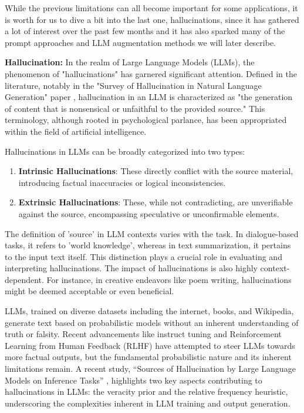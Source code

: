 \documentclass[conference]{IEEEtran}
\begin{document}
While the previous limitations can all become important for some applications, it is worth for us to dive a bit into the last one, hallucinations, since it has gathered a lot of interest over the past few months and it has also sparked many of the prompt approaches and LLM augmentation methods we will later describe.

\textbf{Hallucination:}
In the realm of Large Language Models (LLMs), the phenomenon of "hallucinations" has garnered significant attention. Defined in the literature, notably in the "Survey of Hallucination in Natural Language Generation" paper \cite{ziweiHallucinations}, hallucination in an LLM is characterized as "the generation of content that is nonsensical or unfaithful to the provided source." This terminology, although rooted in psychological parlance, has been appropriated within the field of artificial intelligence.

Hallucinations in LLMs can be broadly categorized into two types:

\begin{enumerate}
    \item \textbf{Intrinsic Hallucinations}: These directly conflict with the source material, introducing factual inaccuracies or logical inconsistencies.
    \item \textbf{Extrinsic Hallucinations}: These, while not contradicting, are unverifiable against the source, encompassing speculative or unconfirmable elements.
\end{enumerate}

The definition of 'source' in LLM contexts varies with the task. In dialogue-based tasks, it refers to 'world knowledge', whereas in text summarization, it pertains to the input text itself. This distinction plays a crucial role in evaluating and interpreting hallucinations. The impact of hallucinations is also highly context-dependent. For instance, in creative endeavors like poem writing, hallucinations might be deemed acceptable or even beneficial.

LLMs, trained on diverse datasets including the internet, books, and Wikipedia, generate text based on probabilistic models without an inherent understanding of truth or falsity. Recent advancements like instruct tuning and Reinforcement Learning from Human Feedback (RLHF) have attempted to steer LLMs towards more factual outputs, but the fundamental probabilistic nature and its inherent limitations remain. A recent study, “Sources of Hallucination by Large Language Models on Inference Tasks” \cite{mckenna2023sources}, highlights two key aspects contributing to hallucinations in LLMs: the veracity prior and the relative frequency heuristic, underscoring the complexities inherent in LLM training and output generation.
\end{document}

